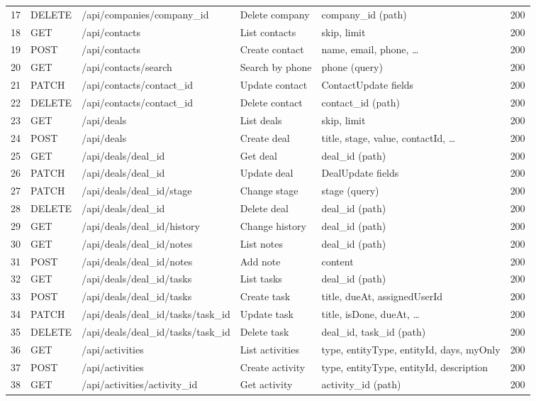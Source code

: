 \begin{longtable}{@{}C{0.4cm} C{1.5cm} L{5.5cm} L{3.8cm} L{3.4cm} C{1.4cm}@{}}
17 & DELETE & /api/companies/{company\_id} & Delete company & company\_id (path) & 200 \\
18 & GET & /api/contacts & List contacts & skip, limit & 200 \\
19 & POST & /api/contacts & Create contact & name, email, phone, … & 200 \\
20 & GET & /api/contacts/search & Search by phone & phone (query) & 200 \\
21 & PATCH & /api/contacts/{contact\_id} & Update contact & ContactUpdate fields & 200 \\
22 & DELETE & /api/contacts/{contact\_id} & Delete contact & contact\_id (path) & 200 \\
23 & GET & /api/deals & List deals & skip, limit & 200 \\
24 & POST & /api/deals & Create deal & title, stage, value, contactId, … & 200 \\
25 & GET & /api/deals/{deal\_id} & Get deal & deal\_id (path) & 200 \\
26 & PATCH & /api/deals/{deal\_id} & Update deal & DealUpdate fields & 200 \\
27 & PATCH & /api/deals/{deal\_id}/stage & Change stage & stage (query) & 200 \\
28 & DELETE & /api/deals/{deal\_id} & Delete deal & deal\_id (path) & 200 \\
29 & GET & /api/deals/{deal\_id}/history & Change history & deal\_id (path) & 200 \\
30 & GET & /api/deals/{deal\_id}/notes & List notes & deal\_id (path) & 200 \\
31 & POST & /api/deals/{deal\_id}/notes & Add note & content & 200 \\
32 & GET & /api/deals/{deal\_id}/tasks & List tasks & deal\_id (path) & 200 \\
33 & POST & /api/deals/{deal\_id}/tasks & Create task & title, dueAt, assignedUserId & 200 \\
34 & PATCH & /api/deals/{deal\_id}/tasks/{task\_id} & Update task & title, isDone, dueAt, … & 200 \\
35 & DELETE & /api/deals/{deal\_id}/tasks/{task\_id} & Delete task & deal\_id, task\_id (path) & 200 \\
36 & GET & /api/activities & List activities & type, entityType, entityId, days, myOnly & 200 \\
37 & POST & /api/activities & Create activity & type, entityType, entityId, description & 200 \\
38 & GET & /api/activities/{activity\_id} & Get activity & activity\_id (path) & 200 \\

\end{longtable}
